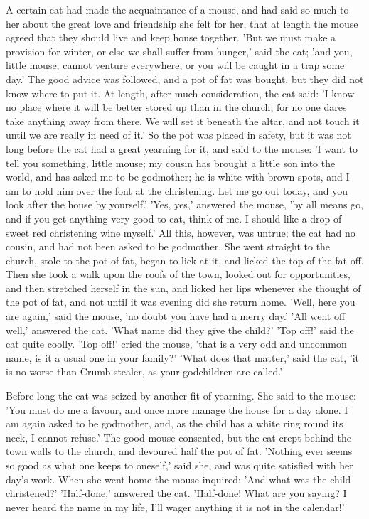 \documentclass[12pt]{book}
\begin{document}
A certain cat had made the acquaintance of a mouse, and had said so
much to her about the great love and friendship she felt for her, that
at length the mouse agreed that they should live and keep house
together. 'But we must make a provision for winter, or else we shall
suffer from hunger,' said the cat; 'and you, little mouse, cannot
venture everywhere, or you will be caught in a trap some day.' The
good advice was followed, and a pot of fat was bought, but they did
not know where to put it. At length, after much consideration, the cat
said: 'I know no place where it will be better stored up than in the
church, for no one dares take anything away from there. We will set it
beneath the altar, and not touch it until we are really in need of
it.' So the pot was placed in safety, but it was not long before the
cat had a great yearning for it, and said to the mouse: 'I want to
tell you something, little mouse; my cousin has brought a little son
into the world, and has asked me to be godmother; he is white with
brown spots, and I am to hold him over the font at the christening.
Let me go out today, and you look after the house by yourself.' 'Yes,
yes,' answered the mouse, 'by all means go, and if you get anything
very good to eat, think of me. I should like a drop of sweet red
christening wine myself.' All this, however, was untrue; the cat had
no cousin, and had not been asked to be godmother. She went straight
to the church, stole to the pot of fat, began to lick at it, and
licked the top of the fat off. Then she took a walk upon the roofs of
the town, looked out for opportunities, and then stretched herself in
the sun, and licked her lips whenever she thought of the pot of fat,
and not until it was evening did she return home. 'Well, here you are
again,' said the mouse, 'no doubt you have had a merry day.' 'All went
off well,' answered the cat. 'What name did they give the child?' 'Top
off!' said the cat quite coolly. 'Top off!' cried the mouse, 'that is
a very odd and uncommon name, is it a usual one in your family?' 'What
does that matter,' said the cat, 'it is no worse than Crumb-stealer,
as your godchildren are called.'

Before long the cat was seized by another fit of yearning. She said to
the mouse: 'You must do me a favour, and once more manage the house
for a day alone. I am again asked to be godmother, and, as the child
has a white ring round its neck, I cannot refuse.' The good mouse
consented, but the cat crept behind the town walls to the church, and
devoured half the pot of fat. 'Nothing ever seems so good as what one
keeps to oneself,' said she, and was quite satisfied with her day's
work. When she went home the mouse inquired: 'And what was the child
christened?' 'Half-done,' answered the cat. 'Half-done! What are you
saying? I never heard the name in my life, I'll wager anything it is
not in the calendar!'
\end{document}
